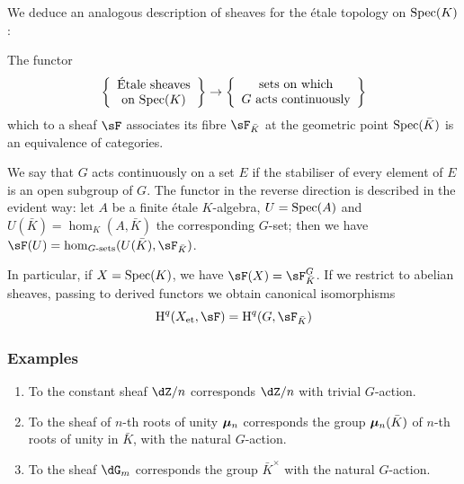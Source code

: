 We deduce an analogous description of sheaves for the \'etale topology on
$\operatorname{Spec}(K)$:





\begin{proposition}\label{I:2-4-4}
The functor
\[
  \left\{\begin{array}{c}
          \textnormal{\'Etale sheaves} \\
          \textnormal{on $\operatorname{Spec}(K)$}
        \end{array}\right\}
  \to
  \left\{\begin{array}{c}
          \textnormal{sets on which} \\
          \textnormal{$G$ acts continuously}
        \end{array}\right\}
\]
which to a
sheaf $\sF$ associates its fibre $\sF_{\bar K}$ at the geometric point
$\operatorname{Spec}(\bar K)$ is an equivalence of categories.
\end{proposition}

We say that $G$ acts continuously on a set $E$ if the stabiliser of every
element of $E$ is an open subgroup of $G$. The functor in the
reverse direction is described in the evident way: let $A$ be a
finite \'etale $K$-algebra, $U=\operatorname{Spec}(A)$ and $U(\bar K)=\hom_K(A,\bar K)$ the
corresponding $G$-set; then we have
$\sF(U)= \hom_{G\text{-sets}}(U(\bar K),\sF_{\bar K})$.

In particular, if $X=\operatorname{Spec}(K)$, we have $\sF(X) = \sF_{\bar K}^G$. If we
restrict to abelian sheaves, passing to derived functors we obtain canonical
isomorphisms
\[
  \h^q(\et X,\sF) = \h^q(G,\sF_{\bar K})
\]





\subsubsection{Examples}\label{I:2-4-5}

\begin{enumerate}[\indent a)]
  \item To the constant sheaf $\dZ/n$ corresponds $\dZ/n$ with trivial $G$-action.
  \item To the sheaf of $n$-th roots of unity ${\bm\mu}_n$ corresponds
    the group ${\bm\mu}_n(\bar K)$ of $n$-th roots of unity in
    $\bar K$, with the natural $G$-action.
  \item To the sheaf $\dG_m$ corresponds the group $\bar K^\times$ with the natural
    $G$-action.
\end{enumerate}




















